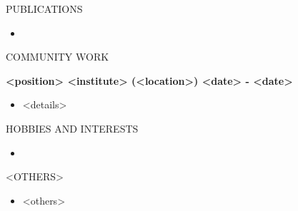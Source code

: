 \documentclass[10.5pt]{article}
\begin{document}

\begin{section}{PUBLICATIONS}
    
\begin{itemize}[leftmargin=1.5em]\itemsep -0.5ex
    \item <your publications, bold your name, then italic and hyperlink its title>
\end{itemize}

\end{section}


\begin{section}{COMMUNITY WORK}

\textbf{<position> \hfill <institute> (<location>) \hfill <date> - <date>}

\begin{itemize}[leftmargin=1.5em]\itemsep -0.5ex
    \item <details>
\end{itemize}

\end{section}


\begin{section}{HOBBIES AND INTERESTS}

    \begin{itemize}[leftmargin=1.5em]\itemsep -0.5ex
        \item <your hobbies>
    \end{itemize}
    
\end{section}

\begin{section}{<OTHERS>}

    \begin{itemize}[leftmargin=1.5em]\itemsep -0.5ex
        \item <others>
    \end{itemize}
    
\end{section}
\end{document}
